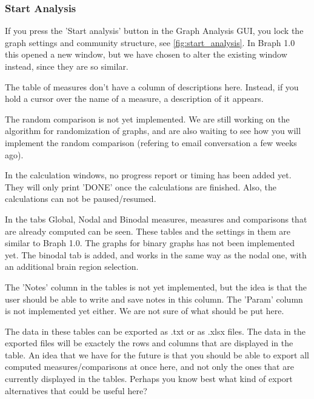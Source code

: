 \documentclass{article}
\begin{document}
\subsubsection{Start Analysis}
\label{sec:start_analysis}

If you press the 'Start analysis' button in the Graph Analysis GUI, you lock the graph settings and community structure, see \cref{fig:start_analysis}. In Braph 1.0 this opened a new window, but we have chosen to alter the existing window instead, since they are so similar. 


The table of measures don't have a column of descriptions here. Instead, if you hold a cursor over the name of a measure, a description of it appears. 

The random comparison is not yet implemented. We are still working on the algorithm for randomization of graphs, and are also waiting to see how you will implement the random comparison (refering to email conversation a few weeks ago).

In the calculation windows, no progress report or timing has been added yet. They will only print 'DONE' once the calculations are finished. Also, the calculations can not be paused/resumed. 

In the tabs Global, Nodal and Binodal measures, measures and comparisons that are already computed can be seen. These tables and the settings in them are similar to Braph 1.0. The graphs for binary graphs has not been implemented yet. The binodal tab is added, and works in the same way as the nodal one, with an additional brain region selection. 

The 'Notes' column in the tables is not yet implemented, but the idea is that the user should be able to write and save notes in this column. The 'Param' column is not implemented yet either. We are not sure of what should be put here.

The data in these tables can be exported as .txt or as .xlsx files. The data in the exported files will be exactely the rows and columns that are displayed in the table. An idea that we have for the future is that you should be able to export all computed measures/comparisons at once here, and not only the ones that are currently displayed in the tables. Perhaps you know best what kind of export alternatives that could be useful here?
\end{document}
